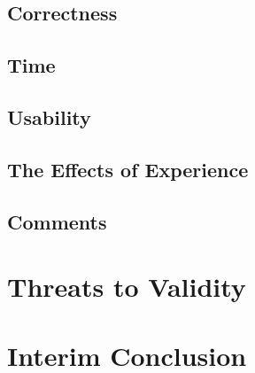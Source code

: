 \documentclass[../thesis]{subfiles}
\begin{document}
\subsection{Correctness}\label{subsec:correct}
\fxfatal{}

\subsection{Time}
\fxfatal{}

\subsection{Usability}
\fxfatal{}


\subsection{The Effects of Experience}\label{subsec:experience}
\fxfatal{}

\subsection{Comments}
\fxfatal{}

\section{Threats to Validity}
\fxfatal{}

\section{Interim Conclusion}  %
\fxfatal{}
\end{document}
